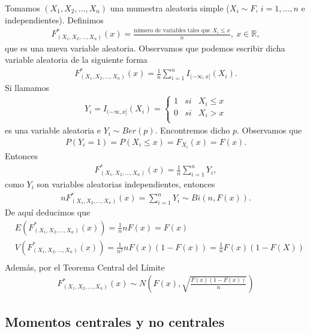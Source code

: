 Tomamos $(X_1, X_2,..., X_n)$ una mumestra aleatoria simple ($X_i \sim F$, $i = 1,...,n$ e independientes). Definimos
\begin{align*}
    F_{(X_1, X_2,..., X_n)}^*(x) = \frac{\text{número de variables tales que } X_i \leq x}{n}, \ x \in \mathbb{R},
\end{align*}
que es una nueva variable aleatoria. Observamos que podemos escribir dicha variable aleatoria de la siguiente forma
\begin{align*}
    F_{(X_1, X_2,..., X_n)}^*(x) = \frac{1}{n}\sum_{i=1}^{n}{I_{(-\infty,x]}(X_i)}.
\end{align*}
Si llamamos
\begin{align*}
    Y_i = I_{(-\infty,x]}(X_i) = \left\{ \begin{array}{lcc}
                                             1 & si & X_i \leq x \\
                                             0 & si & X_i > x    \\
                                         \end{array}
    \right.
\end{align*}
es una variable aleatoria e $Y_i \sim Ber(p)$. Encontremos dicho $p$. Observamos que
\begin{align*}
    P(Y_i = 1) = P(X_i \leq x) = F_{X_i}(x) = F(x).
\end{align*}
Entonces
\begin{align*}
    F_{(X_1, X_2,..., X_n)}^*(x) = \frac{1}{n}\sum_{i=1}^{n}{Y_i},
\end{align*}
como $Y_i$ son variables aleatorias independientes, entonces
\begin{align*}
    nF_{(X_1, X_2,..., X_n)}^*(x) = \sum_{i=1}^{n}{Y_i} \sim Bi(n, F(x)).
\end{align*}
De aquí deducimos que
\begin{align*}
     & E(F_{(X_1, X_2,..., X_n)}^*(x)) = \frac{1}{n}nF(x) = F(x)                                  \\
     & V(F_{(X_1, X_2,..., X_n)}^*(x)) = \frac{1}{n^2}nF(x)(1 - F(x)) = \frac{1}{n}F(x)(1 - F(X)) \\
\end{align*}
Además, por el Teorema Central del Límite
\begin{align*}
    F_{(X_1, X_2,..., X_n)}^*(x) \sim N\left( F(x), \sqrt{\frac{F(x)(1 - F(x))}{n}}\right)
\end{align*}

\subsection{Momentos centrales y no centrales}

